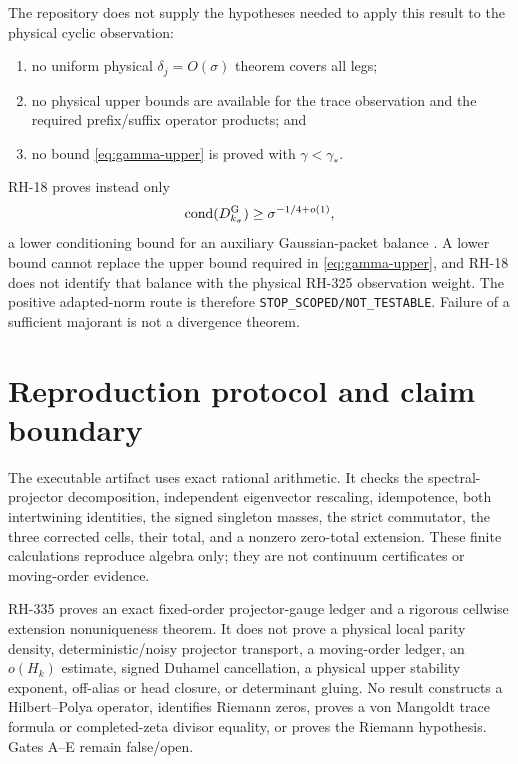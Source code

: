 \documentclass[11pt]{article}
\theoremstyle{remark}
\begin{document}
The repository does not supply the hypotheses needed to apply this result to
the physical cyclic observation:
\begin{enumerate}[label=\textup{(M\arabic*)},leftmargin=3em]
\item no uniform physical $\delta_j=O(\sigma)$ theorem covers all legs;
\item no physical upper bounds are available for the trace observation and
the required prefix/suffix operator products; and
\item no bound \eqref{eq:gamma-upper} is proved with
$\gamma<\gamma_*$.
\end{enumerate}
RH-18 proves instead only
\begin{equation}\label{eq:rh18-lower}
 \operatorname{cond}(D^{\rm G}_{k_\sigma})
 \ge \sigma^{-1/4+o(1)},
\end{equation}
a lower conditioning bound for an auxiliary Gaussian-packet balance
\citep{WangGaussianReturn2026}.  A lower bound cannot replace the upper
bound required in \eqref{eq:gamma-upper}, and RH-18 does not identify that
balance with the physical RH-325 observation weight.  The positive
adapted-norm route is therefore \texttt{STOP\_SCOPED/NOT\_TESTABLE}.
Failure of a sufficient majorant is not a divergence theorem.

\section{Reproduction protocol and claim boundary}

The executable artifact uses exact rational arithmetic.  It checks the
spectral-projector decomposition, independent eigenvector rescaling,
idempotence, both intertwining identities, the signed singleton masses, the
strict commutator, the three corrected cells, their total, and a nonzero
zero-total extension.  These finite calculations reproduce algebra only;
they are not continuum certificates or moving-order evidence.

RH-335 proves an exact fixed-order projector-gauge ledger and a rigorous
cellwise extension nonuniqueness theorem.  It does not prove a physical local
parity density, deterministic/noisy projector transport, a moving-order
ledger, an $o(H_k)$ estimate, signed Duhamel cancellation, a physical upper
stability exponent, off-alias or head closure, or determinant gluing.  No
result constructs a Hilbert--Polya operator, identifies Riemann zeros, proves
a von Mangoldt trace formula or completed-zeta divisor equality, or proves
the Riemann hypothesis.  Gates A--E remain false/open.



\end{document}
